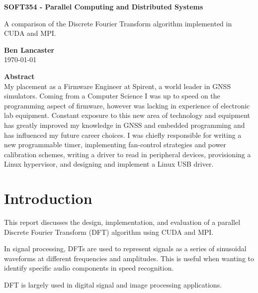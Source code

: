\documentclass[11pt,a4paper]{article}
\begin{document}
\begin{titlepage}
\begin{center}

\vspace*{3cm}
\Large
\textbf{SOFT354 - Parallel Computing and Distributed Systems}

\vspace{0.4cm}
\large
A comparison of the Discrete Fourier Transform algorithm implemented in CUDA and MPI.

\vspace{4cm}
\textbf{Ben Lancaster}\\
\today

\vspace{4cm}
\textbf{Abstract}\\
\small
My placement as a Firmware Engineer at Spirent, a world leader in GNSS simulators. Coming from a Computer Science I was up to speed on the programming aspect of firmware, however was lacking in experience of electronic lab equipment. Constant exposure to this new area of technology and equipment has greatly improved my knowledge in GNSS and embedded programming and has influenced my future career choices. I was chiefly responsible for writing a new programmable timer, implementing fan-control strategies and power calibration schemes, writing a driver to read in peripheral devices, provisioning a Linux hypervisor, and designing and implement a Linux USB driver.

\end{center}

\end{titlepage}

\renewcommand*\contentsname{Table of Contents}
\tableofcontents
\newpage

\section{Introduction}
This report discusses the design, implementation, and evaluation of a parallel Discrete Fourier Transform (DFT) algorithm using CUDA and MPI.

In signal processing, DFTs are used to represent signals as a series of sinusoidal waveforms at different frequencies and amplitudes. This is useful when wanting to identify specific audio components in speed recognition. 

DFT is largely used in digital signal and image processing applications. 
\end{document}
